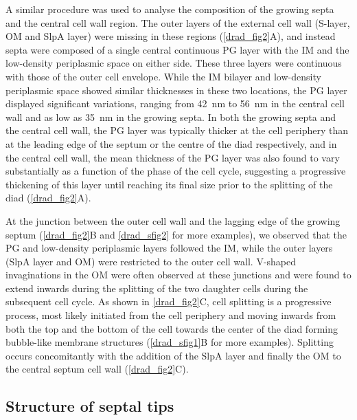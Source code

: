 A similar procedure was used to analyse the composition of the growing septa and the central cell wall region.
The outer layers of the external cell wall (S-layer, OM and SlpA layer) were missing in these regions (\autoref{drad_fig2}A), and instead septa were composed of a single central continuous PG layer with the IM and the low-density periplasmic space on either side.
These three layers were continuous with those of the outer cell envelope.
While the IM bilayer and low-density periplasmic space showed similar thicknesses in these two locations, the PG layer displayed significant variations, ranging from \qty{42}{nm} to \qty{56}{nm} in the central cell wall and as low as \qty{35}{nm} in the growing septa.
In both the growing septa and the central cell wall, the PG layer was typically thicker at the cell periphery than at the leading edge of the septum or the centre of the diad respectively, and in the central cell wall, the mean thickness of the PG layer was also found to vary substantially as a function of the phase of the cell cycle, suggesting a progressive thickening of this layer until reaching its final size prior to the splitting of the diad (\autoref{drad_fig2}A).

At the junction between the outer cell wall and the lagging edge of the growing septum (\autoref{drad_fig2}B and \autoref{drad_sfig2} for more examples), we observed that the PG and low-density periplasmic layers followed the IM, while the outer layers (SlpA layer and OM) were restricted to the outer cell wall.
V-shaped invaginations in the OM were often observed at these junctions and were found to extend inwards during the splitting of the two daughter cells during the subsequent cell cycle.
As shown in \autoref{drad_fig2}C, cell splitting is a progressive process, most likely initiated from the cell periphery and moving inwards from both the top and the bottom of the cell towards the center of the diad forming bubble-like membrane structures (\autoref{drad_sfig1}B for more examples).
Splitting occurs concomitantly with the addition of the SlpA layer and finally the OM to the central septum cell wall (\autoref{drad_fig2}C).

\FloatBarrier

\subsection{Structure of septal tips}


